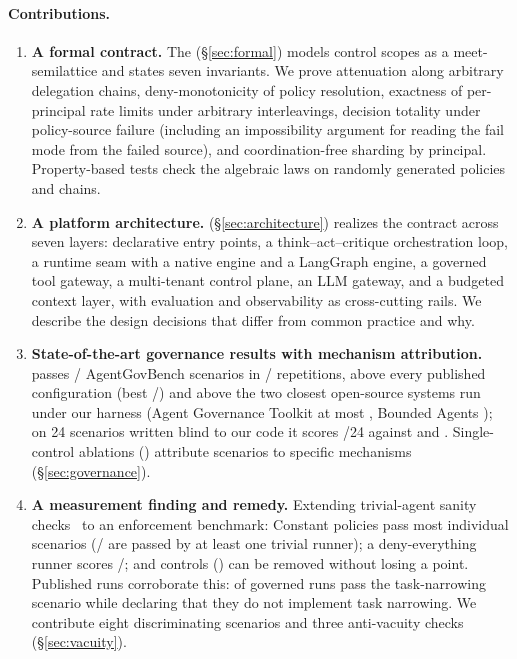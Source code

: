 \paragraph{Contributions.}
\begin{enumerate}
\item \textbf{A formal contract.} The \gec{} (\S\ref{sec:formal}) models control scopes as a meet-semilattice and states seven invariants. We prove attenuation along arbitrary delegation chains, deny-monotonicity of policy resolution, exactness of per-principal rate limits under arbitrary interleavings, decision totality under policy-source failure (including an impossibility argument for reading the fail mode from the failed source), and coordination-free sharding by principal. Property-based tests check the algebraic laws on randomly generated policies and chains.
\item \textbf{A platform architecture.} \method{} (\S\ref{sec:architecture}) realizes the contract across seven layers: declarative entry points, a think--act--critique orchestration loop, a runtime seam with a native engine and a LangGraph engine, a governed tool gateway, a multi-tenant control plane, an LLM gateway, and a budgeted context layer, with evaluation and observability as cross-cutting rails. We describe the design decisions that differ from common practice and why.
\item \textbf{State-of-the-art governance results with mechanism attribution.} \method{} passes \AGBFoundry{}/\AGBTotal{} AgentGovBench scenarios in \AGBRepeatsPerfect{}/\AGBRepeats{} repetitions, above every published configuration (best \AGBBestPublished{}/\AGBTotal{}) and above the two closest open-source systems run under our harness (Agent Governance Toolkit at most \AGTBestOfficial{}, Bounded Agents \APCOfficial{}); on 24 scenarios written blind to our code it scores \IndepFoundry{}/24 against \AGTBestIndep{} and \APCIndep{}. Single-control ablations (\AblationCount{}) attribute \AttributedOfficial{} scenarios to specific mechanisms (\S\ref{sec:governance}).
\item \textbf{A measurement finding and remedy.} Extending trivial-agent sanity checks~\cite{zhu2025abc} to an enforcement benchmark: Constant policies pass most individual scenarios (\VacuousAny{}/\AGBTotal{} are passed by at least one trivial runner); a deny-everything runner scores \AGBDenyAll{}/\AGBTotal{}; and \OfficialBlindControls{} controls (\OfficialBlindList{}) can be removed without losing a point. Published runs corroborate this: \ACPDeclaredNarrowingPassed{} of \ACPDeclaredNarrowing{} governed runs pass the task-narrowing scenario while declaring that they do not implement task narrowing. We contribute eight discriminating scenarios and three anti-vacuity checks (\S\ref{sec:vacuity}).

\end{enumerate}
